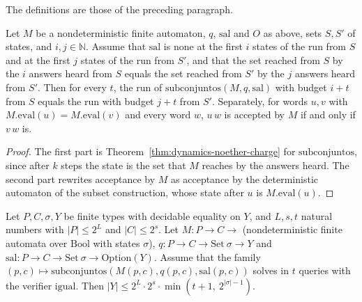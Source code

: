 \begin{definition}
  \label{def:dynamics-subsets}
  \leanok
  The definitions are those of the preceding paragraph.
  \own{}
\end{definition}

\begin{theorem}
  \label{thm:dynamics-subsets-charge}
  \leanok
  Let $M$ be a nondeterministic finite automaton, $q$, $\mathrm{sal}$ and $O$ as above, sets
  $S, S'$ of states, and $i, j \in \mathbb{N}$. Assume that $\mathrm{sal}$ is $\mathrm{none}$ at
  the first $i$ states of the run from $S$ and at the first $j$ states of the run from $S'$, and
  that the set reached from $S$ by the $i$ answers heard from $S$ equals the set reached from $S'$
  by the $j$ answers heard from $S'$. Then for every $t$, the run of $\mathrm{subconjuntos}(M, q,
  \mathrm{sal})$ with budget $i + t$ from $S$ equals the run with budget $j + t$ from $S'$.
  Separately, for words $u, v$ with $M.\mathrm{eval}(u) = M.\mathrm{eval}(v)$ and every word $w$,
  $u\,w$ is accepted by $M$ if and only if $v\,w$ is.
  \own{}
\end{theorem}

\begin{proof}
  \leanok
  The first part is Theorem~\ref{thm:dynamics-noether-charge} for $\mathrm{subconjuntos}$, since
  after $k$ steps the state is the set that $M$ reaches by the answers heard. The second part
  rewrites acceptance by $M$ as acceptance by the deterministic automaton of the subset
  construction, whose state after $u$ is $M.\mathrm{eval}(u)$.
\end{proof}

\begin{theorem}
  \label{thm:dynamics-subsets-law}
  \leanok
  Let $P, C, \sigma, Y$ be finite types with decidable equality on $Y$, and $L, s, t$ natural
  numbers with $|P| \le 2^L$ and $|C| \le 2^s$. Let $M : P \to C \to$ (nondeterministic finite
  automata over $\mathrm{Bool}$ with states $\sigma$), $q : P \to C \to \mathrm{Set}\ \sigma \to Y$
  and $\mathrm{sal} : P \to C \to \mathrm{Set}\ \sigma \to \mathrm{Option}(Y)$. Assume that the
  family $(p, c) \mapsto \mathrm{subconjuntos}(M(p,c), q(p,c), \mathrm{sal}(p,c))$ solves in $t$
  queries with the verifier $\mathrm{igual}$. Then
  $|Y| \le 2^L \cdot 2^s \cdot \min(t+1,\ 2^{|\sigma| - 1})$.
  \own{}
\end{theorem}

